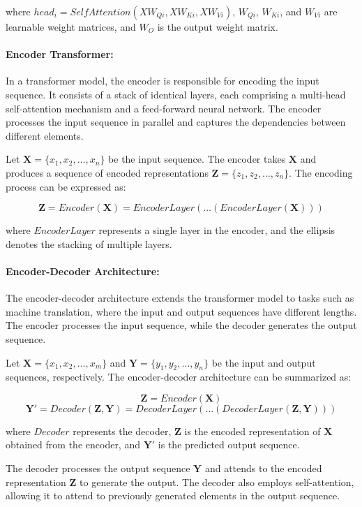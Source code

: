 \documentclass[a4paper,12pt]{article}
\begin{document}
where $head_i = SelfAttention(XW_{Qi}, XW_{Ki}, XW_{Vi})$, $W_{Qi}$, $W_{Ki}$, and $W_{Vi}$ are learnable weight matrices, and $W_O$ is the output weight matrix.

\paragraph{Encoder Transformer:}

In a transformer model, the encoder is responsible for encoding the input sequence. It consists of a stack of identical layers, each comprising a multi-head self-attention mechanism and a feed-forward neural network. The encoder processes the input sequence in parallel and captures the dependencies between different elements.

Let $\mathbf{X} = \{x_1, x_2, \ldots, x_n\}$ be the input sequence. The encoder takes $\mathbf{X}$ and produces a sequence of encoded representations $\mathbf{Z} = \{z_1, z_2, \ldots, z_n\}$. The encoding process can be expressed as:

$$\mathbf{Z} = Encoder(\mathbf{X}) = EncoderLayer(\ldots(EncoderLayer(\mathbf{X})))$$

where $EncoderLayer$ represents a single layer in the encoder, and the ellipsis denotes the stacking of multiple layers.

\paragraph{Encoder-Decoder Architecture:}

The encoder-decoder architecture extends the transformer model to tasks such as machine translation, where the input and output sequences have different lengths. The encoder processes the input sequence, while the decoder generates the output sequence.

Let $\mathbf{X} = \{x_1, x_2, \ldots, x_m\}$ and $\mathbf{Y} = \{y_1, y_2, \ldots, y_n\}$ be the input and output sequences, respectively. The encoder-decoder architecture can be summarized as:

$$\mathbf{Z} = Encoder(\mathbf{X})$$
$$\mathbf{Y'} = Decoder(\mathbf{Z}, \mathbf{Y}) = DecoderLayer(\ldots(DecoderLayer(\mathbf{Z}, \mathbf{Y})))$$

where $Decoder$ represents the decoder, $\mathbf{Z}$ is the encoded representation of $\mathbf{X}$ obtained from the encoder, and $\mathbf{Y'}$ is the predicted output sequence.

The decoder processes the output sequence $\mathbf{Y}$ and attends to the encoded representation $\mathbf{Z}$ to generate the output. The decoder also employs self-attention, allowing it to attend to previously generated elements in the output sequence.
\end{document}
